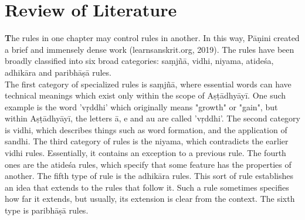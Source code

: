 \chapter{Review of Literature}
\label{sec:Review of Literature}



\lettrine[findent=2pt]{\textbf{T}}{}he rules in one chapter may control rules in another. In this way, Pāṇini created a brief and immensely dense work (learnsanskrit.org, 2019). The rules have been broadly classified into six broad categories: saṃjñā, vidhi, niyama, atideśa, adhikāra and paribhāṣā rules.\\ 
The first category of specialized rules is saṃjñā, where essential words can have technical meanings which exist only within the scope of Aṣṭādhyāyī. One such example is the word 'vṛddhi’ which originally means "growth" or "gain", but within Aṣṭādhyāyī, the letters ā, e and au are called 'vṛddhi’. The second category is vidhi, which describes things such as word formation, and the application of sandhi. The third category of rules is the niyama, which contradicts the earlier vidhi rules. Essentially, it contains an exception to a previous rule. The fourth ones are the atideśa rules, which specify that some feature has the properties of another. The fifth type of rule is the adhikāra rules. This sort of rule establishes an idea that extends to the rules that follow it. Such a rule sometimes specifies how far it extends, but usually, its extension is clear from the context. The sixth type is paribhāṣā rules. \\

